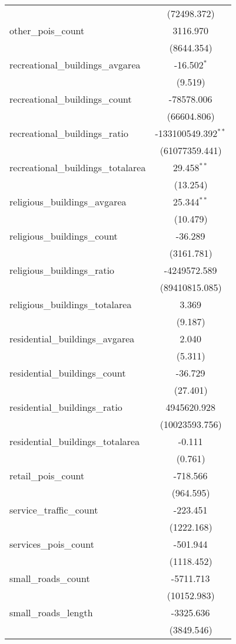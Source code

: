\begin{table}[!htbp]
\begin{tabular}{@{\extracolsep{5pt}}lc}
  & (72498.372) \\
 other_pois_count & 3116.970$^{}$ \\
  & (8644.354) \\
 recreational_buildings_avgarea & -16.502$^{*}$ \\
  & (9.519) \\
 recreational_buildings_count & -78578.006$^{}$ \\
  & (66604.806) \\
 recreational_buildings_ratio & -133100549.392$^{**}$ \\
  & (61077359.441) \\
 recreational_buildings_totalarea & 29.458$^{**}$ \\
  & (13.254) \\
 religious_buildings_avgarea & 25.344$^{**}$ \\
  & (10.479) \\
 religious_buildings_count & -36.289$^{}$ \\
  & (3161.781) \\
 religious_buildings_ratio & -4249572.589$^{}$ \\
  & (89410815.085) \\
 religious_buildings_totalarea & 3.369$^{}$ \\
  & (9.187) \\
 residential_buildings_avgarea & 2.040$^{}$ \\
  & (5.311) \\
 residential_buildings_count & -36.729$^{}$ \\
  & (27.401) \\
 residential_buildings_ratio & 4945620.928$^{}$ \\
  & (10023593.756) \\
 residential_buildings_totalarea & -0.111$^{}$ \\
  & (0.761) \\
 retail_pois_count & -718.566$^{}$ \\
  & (964.595) \\
 service_traffic_count & -223.451$^{}$ \\
  & (1222.168) \\
 services_pois_count & -501.944$^{}$ \\
  & (1118.452) \\
 small_roads_count & -5711.713$^{}$ \\
  & (10152.983) \\
 small_roads_length & -3325.636$^{}$ \\
  & (3849.546) \\

\end{tabular}
\end{table}

